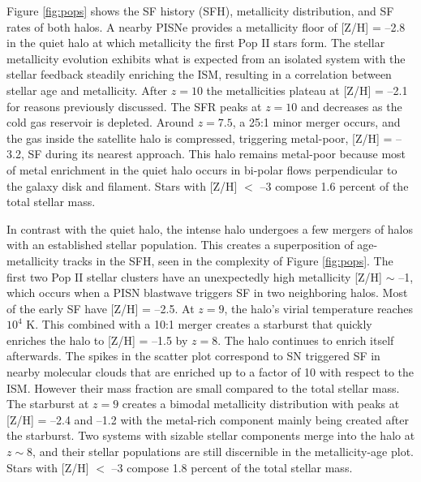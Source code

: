 \documentclass[12pt]{article}
\newcommand\tento[1]{$10^{#1}$}
\begin{document}




Figure \ref{fig:pops} shows the SF history (SFH), metallicity
distribution, and SF rates of both halos.  A nearby PISNe provides a
metallicity floor of [Z/H] = --2.8 in the quiet halo at which
metallicity the first Pop II stars form.  The stellar metallicity
evolution exhibits what is expected from an isolated system with the
stellar feedback steadily enriching the ISM, resulting in a
correlation between stellar age and metallicity.  After $z=10$ the
metallicities plateau at [Z/H] = --2.1 for reasons previously
discussed.  The SFR peaks at $z=10$ and decreases as the cold gas
reservoir is depleted.  Around $z=7.5$, a 25:1 minor merger occurs,
and the gas inside the satellite halo is compressed, triggering
metal-poor, [Z/H] = --3.2, SF during its nearest approach.  This halo
remains metal-poor because most of metal enrichment in the quiet halo
occurs in bi-polar flows perpendicular to the galaxy disk and
filament.  Stars with [Z/H] $<$ --3 compose 1.6 percent of the total
stellar mass.
       
In contrast with the quiet halo, the intense halo undergoes a few
mergers of halos with an established stellar population.  This creates
a superposition of age-metallicity tracks in the SFH, seen in the
complexity of Figure \ref{fig:pops}.  The first two Pop II stellar
clusters have an unexpectedly high metallicity [Z/H] $\sim$ --1, which
occurs when a PISN blastwave triggers SF in two neighboring halos.
Most of the early SF have [Z/H] = --2.5.  At $z=9$, the halo's virial
temperature reaches \tento{4} K.  This combined with a 10:1 merger
creates a starburst that quickly enriches the halo to [Z/H] = --1.5 by
$z=8$.  The halo continues to enrich itself afterwards.  The spikes in
the scatter plot correspond to SN triggered SF in nearby molecular
clouds that are enriched up to a factor of 10 with respect to the ISM.
However their mass fraction are small compared to the total stellar
mass.  The starburst at $z=9$ creates a bimodal metallicity
distribution with peaks at [Z/H] = --2.4 and --1.2 with the metal-rich
component mainly being created after the starburst.  Two systems with
sizable stellar components merge into the halo at $z \sim 8$, and
their stellar populations are still discernible in the metallicity-age
plot.  Stars with [Z/H] $<$ --3 compose 1.8 percent of the total
stellar mass.
\end{document}

